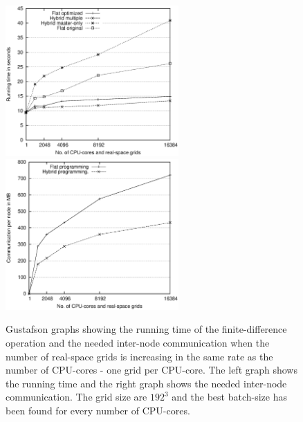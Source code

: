 \documentclass[preprint,3p,times,twocolumn]{elsarticle}
\begin{document}
\begin{figure}
\centerline{
\mbox{\includegraphics[width=250px]{gfx/fidi_gustavson}}
\mbox{\includegraphics[width=250px]{gfx/fidi_gustavson_comm}}
} 
 \caption{Gustafson graphs showing the running time of the finite-difference operation and the needed inter-node communication when the number of real-space grids is increasing in the same rate as the number of CPU-cores - one grid per CPU-core. The left graph shows the running time and the right graph shows the needed inter-node communication. The grid size are $192^3$ and the best batch-size has been found for every number of CPU-cores. }
 \label{fig:gustafson}
\end{figure}
\end{document}
